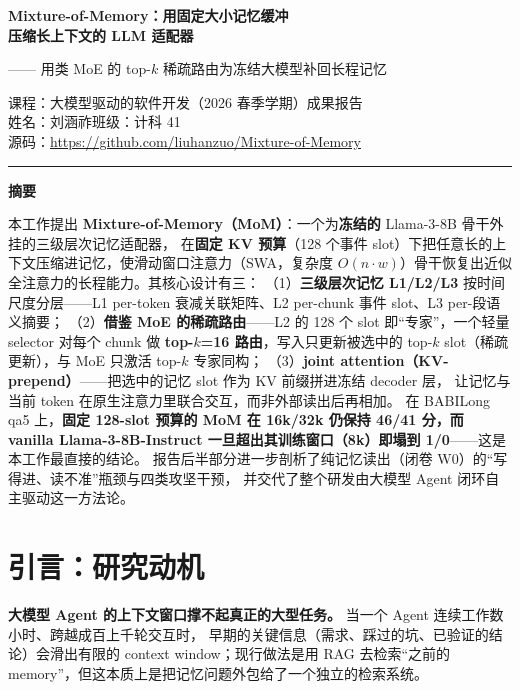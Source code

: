 \documentclass[11pt,a4paper]{ctexart}
\begin{document}
\thispagestyle{empty}
\begin{center}
  \vspace*{0.5cm}
  {\LARGE\bfseries\color{titleblue} Mixture-of-Memory：用固定大小记忆缓冲\\[2pt]
   压缩长上下文的 LLM 适配器\par}
  \vspace{0.4cm}
  {\large —— 用类 MoE 的 top-$k$ 稀疏路由为冻结大模型补回长程记忆\par}
  \vspace{0.8cm}
  {\normalsize
   课程：大模型驱动的软件开发（2026 春季学期）成果报告\\[3pt]
   姓名：刘涵祚\qquad 班级：计科 41\\[3pt]
   源码：\url{https://github.com/liuhanzuo/Mixture-of-Memory}\par}
  \vspace{0.5cm}
  \rule{0.7\textwidth}{0.4pt}
\end{center}

\vspace{0.2cm}
\begin{center}{\large\bfseries\color{titleblue} 摘要}\end{center}
\noindent
本工作提出 \textbf{Mixture-of-Memory（MoM）}：一个为\textbf{冻结的} Llama-3-8B 骨干外挂的三级层次记忆适配器，
在\textbf{固定 KV 预算}（128 个事件 slot）下把任意长的上下文压缩进记忆，使滑动窗口注意力（SWA，复杂度
$O(n\cdot w)$）骨干恢复出近似全注意力的长程能力。其核心设计有三：
（1）\textbf{三级层次记忆 L1/L2/L3} 按时间尺度分层——L1 per-token 衰减关联矩阵、L2 per-chunk 事件 slot、L3 per-段语义摘要；
（2）\textbf{借鉴 MoE 的稀疏路由}——L2 的 128 个 slot 即“专家”，一个轻量 selector 对每个 chunk 做
\textbf{top-$k$=16 路由}，写入只更新被选中的 top-$k$ slot（稀疏更新），与 MoE 只激活 top-$k$ 专家同构；
（3）\textbf{joint attention（KV-prepend）}——把选中的记忆 slot 作为 KV 前缀拼进冻结 decoder 层，
让记忆与当前 token 在原生注意力里联合交互，而非外部读出后再相加。
在 BABILong qa5 上，\textbf{固定 128-slot 预算的 MoM 在 16k/32k 仍保持 46/41 分，而 vanilla Llama-3-8B-Instruct
一旦超出其训练窗口（8k）即塌到 1/0}——这是本工作最直接的结论。
报告后半部分进一步剖析了纯记忆读出（闭卷 W0）的“写得进、读不准”瓶颈与四类攻坚干预，
并交代了整个研发由大模型 Agent 闭环自主驱动这一方法论。

\section{引言：研究动机}
\textbf{大模型 Agent 的上下文窗口撑不起真正的大型任务。} 当一个 Agent 连续工作数小时、跨越成百上千轮交互时，
早期的关键信息（需求、踩过的坑、已验证的结论）会滑出有限的 context window；现行做法是用 RAG
去检索“之前的 memory”，但这本质上是把记忆问题外包给了一个独立的检索系统。
\end{document}

